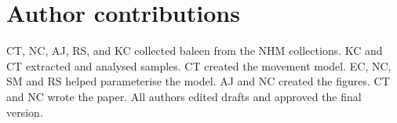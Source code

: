 \documentclass[a4paper,12pt]{article}
\begin{document}
\section{Author contributions}
CT, NC, AJ, RS, and KC collected baleen from the NHM collections. 
KC and CT extracted and analysed samples.
CT created the movement model.
EC, NC, SM and RS helped parameterise the model.
AJ and NC created the figures. 
CT and NC wrote the paper.
All authors edited drafts and approved the final version.



\end{document}
